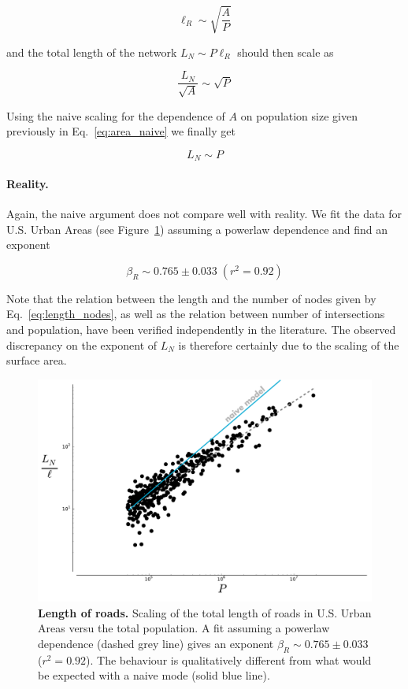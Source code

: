 \begin{equation} 
    \ell_R \sim \sqrt{\frac{A}{P}} 
    \label{eq:length_nodes}
\end{equation}

and the total length of the network $L_N \sim P\ell_R$ should then scale as

\begin{equation} 
    \frac{L_N}{\sqrt{A}} \sim \sqrt{P} 
\end{equation}

Using the naive scaling for the dependence of $A$ on population size given
previously in Eq.~\ref{eq:area_naive} we finally get 

\begin{equation} 
    L_N \sim P
\end{equation}

\paragraph{Reality.} Again, the naive argument does not compare well with
reality. We fit the data for U.S. Urban Areas (see
Figure~\ref{fig:scaling_lanemiles}) assuming a powerlaw dependence and find an
exponent

\begin{equation}
    \boxed{\beta_R \sim 0.765 \pm 0.033\;(r^2 = 0.92)}
\end{equation}

Note that the relation between the length and the number of nodes given by
Eq.~\ref{eq:length_nodes}, as well as the relation between number of
intersections and population, have been verified independently in the
literature. The observed discrepancy on the exponent of $L_N$ is therefore
certainly due to the scaling of the surface area.

\begin{figure}
    \centering
    \includegraphics[width=\textwidth]{gfx/chapter-scaling/scaling_lanemiles.pdf}
    \caption{{\bf Length of roads.} Scaling of the total length of roads in U.S. Urban Areas versu the
    total population. A fit assuming a powerlaw dependence (dashed grey line)
gives an exponent $\beta_R \sim 0.765 \pm 0.033$ ($r^2=0.92$). The behaviour is
qualitatively different from what would be expected with a naive mode (solid
blue line).\label{fig:scaling_lanemiles}}
\end{figure}



